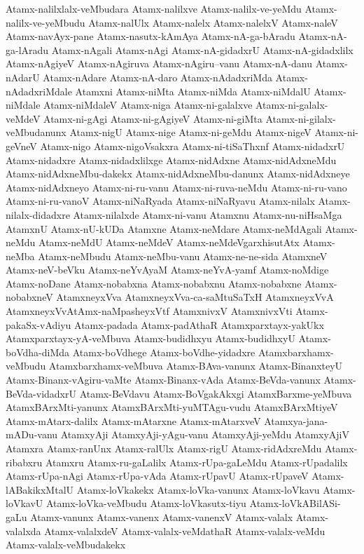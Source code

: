 {Atamx-nalilxlalx-veMbudara
Atamx-nalilxve
Atamx-nalilx-ve-yeMdu
Atamx-nalilx-ve-yeMbudu
Atamx-nalUlx
Atamx-nalelx
Atamx-nalelxV
Atamx-naleV
Atamx-navAyx-pane
Atamx-nasutx-kAmAya
Atamx-nA-ga-bAradu
Atamx-nA-ga-lAradu
Atamx-nAgali
Atamx-nAgi
Atamx-nA-gidadxrU
Atamx-nA-gidadxlilx
Atamx-nAgiyeV
Atamx-nAgiruva
Atamx-nAgiru--vanu
Atamx-nA-danu
Atamx-nAdarU
Atamx-nAdare
Atamx-nA-daro
Atamx-nAdadxriMda
Atamx-nAdadxriMdale
Atamxni
Atamx-niMta
Atamx-niMda
Atamx-niMdalU
Atamx-niMdale
Atamx-niMdaleV
Atamx-niga
Atamx-ni-galalxve
Atamx-ni-galalx-veMdeV
Atamx-ni-gAgi
Atamx-ni-gAgiyeV
Atamx-ni-giMta
Atamx-ni-gilalx-veMbudanunx
Atamx-nigU
Atamx-nige
Atamx-ni-geMdu
Atamx-nigeV
Atamx-ni-geVneV
Atamx-nigo
Atamx-nigoVsakxra
Atamx-ni-tiSaThxnf
Atamx-nidadxrU
Atamx-nidadxre
Atamx-nidadxlilxge
Atamx-nidAdxne
Atamx-nidAdxneMdu
Atamx-nidAdxneMbu-dakekx
Atamx-nidAdxneMbu-danunx
Atamx-nidAdxneye
Atamx-nidAdxneyo
Atamx-ni-ru-vanu
Atamx-ni-ruva-neMdu
Atamx-ni-ru-vano
Atamx-ni-ru-vanoV
Atamx-niNaRyada
Atamx-niNaRyavu
Atamx-nilalx
Atamx-nilalx-didadxre
Atamx-nilalxde
Atamx-ni-vanu
Atamxnu
Atamx-nu-niHsaMga
AtamxnU
Atamx-nU-kUDa
Atamxne
Atamx-neMdare
Atamx-neMdAgali
Atamx-neMdu
Atamx-neMdU
Atamx-neMdeV
Atamx-neMdeVgarxhisutAtx
Atamx-neMba
Atamx-neMbudu
Atamx-neMbu-vanu
Atamx-ne-ne-sida
AtamxneV
Atamx-neV-beVku
Atamx-neYvAyaM
Atamx-neYvA-yamf
Atamx-noMdige
Atamx-noDane
Atamx-nobabxna
Atamx-nobabxnu
Atamx-nobabxne
Atamx-nobabxneV
AtamxneyxVva
AtamxneyxVva-ca-saMtuSaTxH
AtamxneyxVvA
AtamxneyxVvAtAmx-naMpasheyxVtf
AtamxnivxV
AtamxnivxVti
Atamx-pakaSx-vAdiyu
Atamx-padada
Atamx-padAthaR
Atamxparxtayx-yakUkx
Atamxparxtayx-yA-veMbuva
Atamx-budidhxyu
Atamx-budidhxyU
Atamx-boVdha-diMda
Atamx-boVdhege
Atamx-boVdhe-yidadxre
Atamxbarxhamx-veMbudu
Atamxbarxhamx-veMbuva
Atamx-BAva-vanunx
Atamx-BinanxteyU
Atamx-Binanx-vAgiru-vaMte
Atamx-Binanx-vAda
Atamx-BeVda-vanunx
Atamx-BeVda-vidadxrU
Atamx-BeVdavu
Atamx-BoVgakAkxgi
AtamxBarxme-yeMbuva
AtamxBArxMti-yanunx
AtamxBArxMti-yuMTAgu-vudu
AtamxBArxMtiyeV
Atamx-mAtarx-dalilx
Atamx-mAtarxne
Atamx-mAtarxveV
Atamxya-jana-mADu-vanu
AtamxyAji
AtamxyAji-yAgu-vanu
AtamxyAji-yeMdu
AtamxyAjiV
Atamxra
Atamx-ranUnx
Atamx-ralUlx
Atamx-rigU
Atamx-ridAdxreMdu
Atamx-ribabxru
Atamxru
Atamx-ru-gaLalilx
Atamx-rUpa-gaLeMdu
Atamx-rUpadalilx
Atamx-rUpa-nAgi
Atamx-rUpa-vAda
Atamx-rUpavU
Atamx-rUpaveV
Atamx-lABakikxMtalU
Atamx-loVkakekx
Atamx-loVka-vanunx
Atamx-loVkavu
Atamx-loVkavU
Atamx-loVka-veMbudu
Atamx-loVkasutx-tiyu
Atamx-loVkABilASi-gaLu
Atamx-vanunx
Atamx-vanenx
Atamx-vanenxV
Atamx-valalx
Atamx-valalxda
Atamx-valalxdeV
Atamx-valalx-veMdathaR
Atamx-valalx-veMdu
Atamx-valalx-veMbudakekx
}
